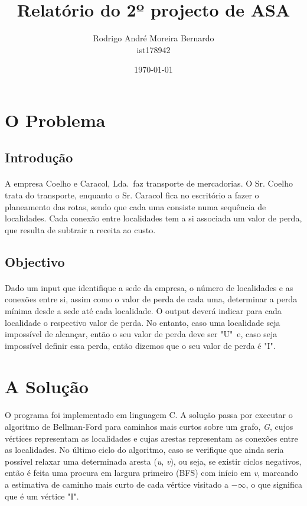 \documentclass[12pt, a4paper]{article}
\title{\textbf{Relatório do 2º projecto de ASA}}
\author{Rodrigo André Moreira Bernardo \\ ist178942}
\affil{Instituto Superior Técnico}
\date{\today}
\begin{document}
\maketitle

\section{O Problema}

\subsection{Introdução}
\paragraph{}
A empresa Coelho e Caracol, Lda.\ faz transporte de mercadorias. O Sr. Coelho
trata do transporte, enquanto o Sr. Caracol fica no escritório a fazer o
planeamento das rotas, sendo que cada uma consiste numa sequência de
localidades. Cada conexão entre localidades tem a si associada um valor de
perda, que resulta de subtrair a receita ao custo.

\subsection{Objectivo}
\paragraph{}
Dado um input que identifique a sede da empresa, o número de localidades e as
conexões entre si, assim como o valor de perda de cada uma, determinar a perda
mínima desde a sede até cada localidade. O output deverá indicar para cada
localidade o respectivo valor de perda. No entanto, caso uma localidade seja
impossível de alcançar, então o seu valor de perda deve ser "U"\ e, caso seja
impossível definir essa perda, então dizemos que o seu valor de perda é "I".

\section{A Solução}
\paragraph{}
O programa foi implementado em linguagem C.  A solução passa por executar o
algoritmo de Bellman-Ford para caminhos mais curtos sobre um grafo, \textit{G},
cujos vértices representam as localidades e cujas arestas representam as
conexões entre as localidades. No último ciclo do algoritmo, caso se verifique
que ainda seria possível relaxar uma determinada aresta (\textit{u},
\textit{v}), ou seja, se existir ciclos negativos, então é feita uma procura em
largura primeiro (BFS) com início em \textit{v}, marcando a estimativa de
caminho mais curto de cada vértice visitado a $-\infty$, o que significa que é
um vértice "I".
\end{document}
